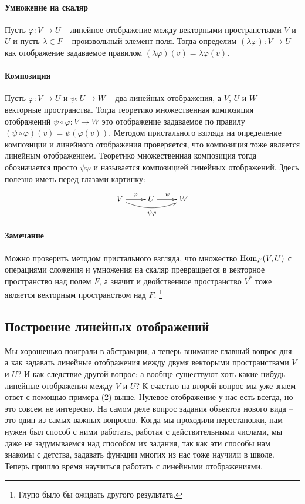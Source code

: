 \paragraph{Умножение на скаляр}

Пусть $\varphi\colon V\to U$ -- линейное отображение между векторными пространствами $V$ и $U$ и пусть $\lambda \in F$ -- произвольный элемент поля.
Тогда определим $(\lambda \varphi)\colon V\to U$ как отображение задаваемое правилом $(\lambda\varphi)(v) = \lambda \varphi(v)$.

\paragraph{Композиция}

Пусть $\varphi\colon V\to U$ и $\psi \colon U \to W$ -- два линейных отображения, а $V$, $U$ и $W$ -- векторные пространства.
Тогда теоретико множественная композиция отображений $\psi\circ \varphi\colon V\to W$ это отображение задаваемое по правилу $(\psi\circ \varphi)(v) = \psi(\varphi(v))$.
Методом пристального взгляда на определение композиции и линейного отображения проверяется, что композиция тоже является линейным отображением.
Теоретико множественная композиция тогда обозначается просто $\psi\varphi$ и называется композицией линейных отображений.
Здесь полезно иметь перед глазами картинку:
\[
\xymatrix{
  {V}\ar[r]^{\varphi}\ar@/_10pt/[rr]_{\psi\varphi}&{U}\ar[r]^{\psi}&{W}
}
\]

\paragraph{Замечание}

Можно проверить методом пристального взгляда, что множество $\operatorname{Hom}_F(V,U)$ с операциями сложения и умножения на скаляр превращается в векторное пространство над полем $F$, а значит и двойственное пространство $V^*$ тоже является векторным пространством над $F$.%
\footnote{Глупо было бы ожидать другого результата.}

\subsection{Построение линейных отображений}

Мы хорошенько поиграли в абстракции, а теперь внимание главный вопрос дня: а как задавать линейные отображения между двумя векторыми пространствами $V$ и $U$?
И как следствие другой вопрос: а вообще существуют хоть какие-нибудь линейные отображения между $V$ и $U$?
К счастью на второй вопрос мы уже знаем ответ с помощью примера (2) выше.
Нулевое отображение у нас есть всегда, но это совсем не интересно.
На самом деле вопрос задания объектов нового вида -- это один из самых важных вопросов.
Когда мы проходили перестановки, нам нужен был способ с ними работать, работая с действительными числами, мы даже не задумываемся над способом их задания, так как эти способы нам знакомы с детства, задавать функции многих из нас тоже научили в школе.
Теперь пришло время научиться работать с линейными отображениями.

